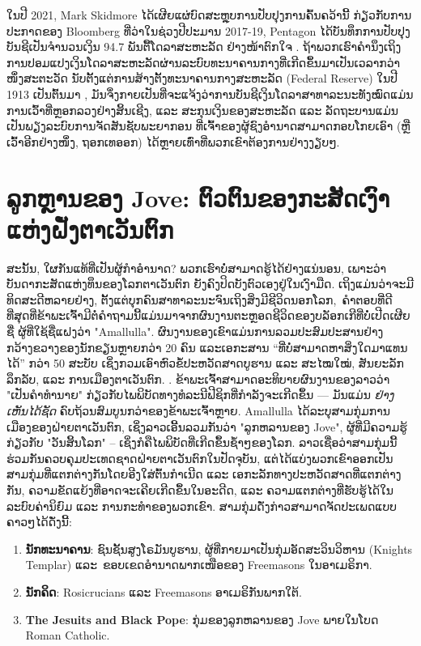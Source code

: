 \documentclass[10pt,twocolumn,letterpaper]{article}
\begin{document}
ໃນປີ 2021, Mark Skidmore ໄດ້ເຜີຍແຜ່ບົດສະຫຼຸບການປັບປຸງການຄົ້ນຄວ້ານີ້ ກ່ຽວກັບການປະກາດຂອງ Bloomberg ທີ່ວ່າໃນຊ່ວງປີປະມານ 2017-19, Pentagon ໄດ້ບັນທຶກການປັບປຸງບັນຊີເປັນຈຳນວນເງິນ 94.7 ພັນຕື້ໂດລາສະຫະລັດ ຢ່າງໜ້າຕົກໃຈ \cite{17,18}. \cite{148}
ຖ້າພວກເຮົາຄໍານຶງເຖິງການປອມແປງເງິນໂດລາສະຫະລັດຜ່ານລະບົບທະນາຄານກາງທີ່ເກີດຂຶ້ນມາເປັນເວລາກວ່າໜຶ່ງສະຕະວັດ ນັບຕັ້ງແຕ່ການສ້າງຕັ້ງທະນາຄານກາງສະຫະລັດ (Federal Reserve) ໃນປີ 1913 ເປັນຕົ້ນມາ \cite{37}, ມັນຈຶ່ງກາຍເປັນທີ່ຈະແຈ້ງວ່າການບັນຊີເງິນໂດລາສາທາລະນະທັງໝົດແມ່ນການເວົ້າທີ່ຫຼອກລວງຢ່າງສິ້ນເຊີງ, ແລະ ສະກຸນເງິນຂອງສະຫະລັດ ແລະ ລັດຖະບານແມ່ນເປັນພຽງລະບົບການຈັດສັນຊັບພະຍາກອນ ທີ່ເຈົ້າຂອງຜູ້ຊົງອຳນາດສາມາດກອບໂກຍເອົາ (ຫຼືເວົ້າອີກຢ່າງໜຶ່ງ, ຖອກເທອອກ) ໄດ້ຫຼາຍເທົ່າທີ່ພວກເຂົາຕ້ອງການຢ່າງງຽບໆ. \cite{149}
\section{ລູກຫຼານຂອງ Jove: ຕົວຕົນຂອງກະສັດເງົາແຫ່ງຝັ່ງຕາເວັນຕົກ}

ສະນັ້ນ, ໃຜກັນແທ້ທີ່ເປັນຜູ້ກຳອຳນາດ? \cite{150}
ພວກເຮົາບໍ່ສາມາດຮູ້ໄດ້ຢ່າງແນ່ນອນ, ເພາະວ່າບັນດາກະສັດແຫ່ງທຶນຂອງໂລກຕາເວັນຕົກ ຍັງຄົງປິດບັງຕົວເອງຢູ່ໃນເງົາມືດ. \cite{151}
ເຖິງແມ່ນວ່າຈະມີທິດສະດີຫລາຍຢ່າງ, ຕັ້ງແຕ່ບຸກຄົນສາທາລະນະຈົນເຖິງສິ່ງມີຊີວິດນອກໂລກ, ຄໍາຕອບທີ່ດີທີ່ສຸດທີ່ຂ້າພະເຈົ້າມີຕໍ່ຄໍາຖາມນີ້ແມ່ນມາຈາກຜົນງານຕະຫຼອດຊີວິດຂອງບລັອກເກີທີ່ບໍ່ເປີດເຜີຍຊື່ ຜູ້ທີ່ໃຊ້ຊື່ແຝງວ່າ "Amallulla". \cite{152}
ຜົນງານຂອງເຂົາແມ່ນການລວມປະສົມປະສານຢ່າງກວ້າງຂວາງຂອງນັກຂຽນຫຼາຍກວ່າ 20 ຄົນ ແລະເອກະສານ “ທີ່ບໍ່ສາມາດຫາສິ່ງໃດມາແທນໄດ້” ກວ່າ 50 ສະບັບ ເຊິ່ງກວມເອົາຫົວຂໍ້ປະຫວັດສາດບູຮານ ແລະ ສະໄໝໃໝ່, ສັນຍະລັກລຶກລັບ, ແລະ ການເມືອງຕາເວັນຕົກ. \cite{33,34}. \cite{153}
ຂ້າພະເຈົ້າສາມາດອະທິບາຍຜົນງານຂອງລາວວ່າ "ເປັນຄໍາທໍານາຍ" ກ່ຽວກັບໄພພິບັດທາງທໍລະນີຟີຊິກທີ່ກຳລັງຈະເກີດຂຶ້ນ — ມັນແມ່ນ \textit{ຢ່າງເຫັນໄດ້ຊັດ} ຄົບຖ້ວນສົມບູນກວ່າຂອງຂ້າພະເຈົ້າຫຼາຍ. \cite{154}
Amallulla ໄດ້ລະບຸສາມກຸ່ມການເມືອງຂອງຝ່າຍຕາເວັນຕົກ, ເຊິ່ງລາວເອີ້ນລວມກັນວ່າ "ລູກຫລານຂອງ Jove", ຜູ້ທີ່ມີຄວາມຮູ້ກ່ຽວກັບ "ວັນສິ້ນໂລກ" – ເຊິ່ງກໍຄືໄພພິບັດທີ່ເກີດຂຶ້ນຊ້ຳໆຂອງໂລກ. \cite{155}
ລາວເຊື່ອວ່າສາມກຸ່ມນີ້ຮ່ວມກັນຄວບຄຸມປະເທດຊາດຝ່າຍຕາເວັນຕົກໃນປັດຈຸບັນ, ແຕ່ໄດ້ແບ່ງພວກເຂົາອອກເປັນສາມກຸ່ມທີ່ແຕກຕ່າງກັນໂດຍອີງໃສ່ຕົ້ນກຳເນີດ ແລະ ເອກະລັກທາງປະຫວັດສາດທີ່ແຕກຕ່າງກັນ, ຄວາມຂັດແຍ້ງທີ່ອາດຈະເຄີຍເກີດຂຶ້ນໃນອະດີດ, ແລະ ຄວາມແຕກຕ່າງທີ່ຮັບຮູ້ໄດ້ໃນລະບົບຄ່ານິຍົມ ແລະ ການກະທຳຂອງພວກເຂົາ. \cite{156}
ສາມກຸ່ມດັ່ງກ່າວສາມາດຈັດປະເພດແບບຄາວໆໄດ້ດັ່ງນີ້:

\begin{flushleft}
\begin{enumerate}
    \item \textbf{ນັກທະນາຄານ}: ຊົນຊັ້ນສູງໂຣມັນບູຮານ, ຜູ້ທີ່ກາຍມາເປັນກຸ່ມອັດສະວິນວິຫານ (Knights Templar) ແລະ ຂອບເຂດອຳນາດພາກເໜືອຂອງ Freemasons ໃນອາເມຣິກາ. \cite{157}
    \item \textbf{ນັກຄິດ}: Rosicrucians ແລະ Freemasons ອາເມຣິກັນພາກໃຕ້. \cite{158}
    \item \textbf{The Jesuits and Black Pope}: ກຸ່ມຂອງລູກຫລານຂອງ Jove ພາຍໃນໂບດ Roman Catholic. \cite{159}
\end{enumerate}
\end{flushleft}
\end{document}
